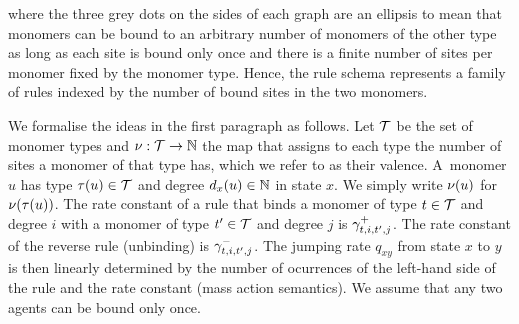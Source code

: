 \begin{center}
\end{center}
where the three grey dots on the sides of each graph
are an ellipsis to mean that monomers can be bound
to an arbitrary number of monomers of the other type
as long as each site is bound only once
and there is a finite number of sites per monomer
fixed by the monomer type.
Hence, the rule schema %
represents a family of rules indexed by %
the number of bound sites in the two monomers.

We formalise the ideas in the first paragraph as follows.
Let $\mathcal{T}$ be the set of monomer types %
and $\nu: \mathcal{T} \to \mathbb{N}$ the map that assigns
to each type the number of sites a monomer of that type has,
which we refer to as their valence.
A~monomer $u$ has type $\tau(u) \in \mathcal{T}$
and degree $d_x(u) \in \mathbb{N}$ in state $x$.
We simply write $\nu(u)$ for $\nu(\tau(u))$.
The rate constant of a rule that binds
a monomer of type $t \in \mathcal{T}$ and degree $i$ with
a monomer of type $t' \in \mathcal{T}$ and degree $j$
is $\gamma^+_{t,i,t',j}$.
The rate constant of the reverse rule (unbinding)
is $\gamma^-_{t,i,t',j}$.
%
The jumping rate $q_{xy}$ from state $x$ to $y$
is then linearly determined by the number of ocurrences
of the left-hand side of the rule and the rate constant
(mass action semantics).
We assume that any two agents can be bound only once.

